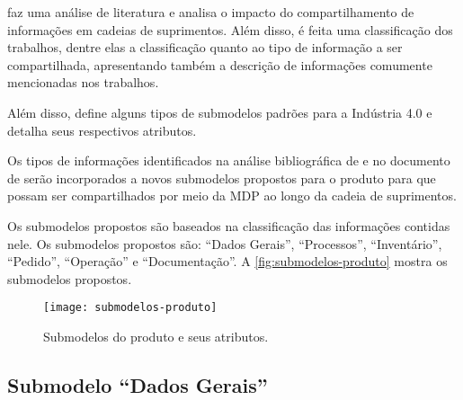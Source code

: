  faz uma análise de literatura e analisa o impacto do compartilhamento de informações em cadeias de suprimentos. Além disso, é feita uma classificação dos trabalhos, dentre elas a classificação quanto ao tipo de informação a ser compartilhada, apresentando também a descrição de informações comumente mencionadas nos trabalhos.

Além disso,  define alguns tipos de submodelos padrões para a Indústria 4.0 e detalha seus respectivos atributos.

Os tipos de informações identificados na análise bibliográfica de  e no documento de  serão incorporados a novos submodelos propostos para o produto para que possam ser compartilhados por meio da MDP ao longo da cadeia de suprimentos.

Os submodelos propostos são baseados na classificação das informações contidas nele. Os submodelos propostos são: ``Dados Gerais'', ``Processos'', ``Inventário'', ``Pedido'', ``Operação'' e ``Documentação''. A \autoref{fig:submodelos-produto} mostra os submodelos propostos.

\begin{figure}[htb!]
	\centering
	\texttt{[image: submodelos-produto]}
	\caption{Submodelos do produto e seus atributos.}
	\label{fig:submodelos-produto}
\end{figure}

\newpage



\subsection{Submodelo ``Dados Gerais''}

